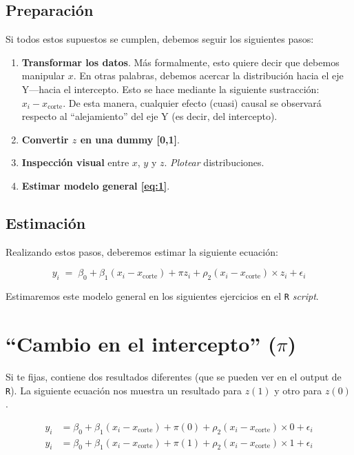 \documentclass[10pt]{article}
\begin{document}
\subsection*{Preparaci\'on}


Si todos estos supuestos se cumplen, debemos seguir los siguientes pasos:

\begin{enumerate}
	\item {\bf Transformar los datos}. M\'as formalmente, esto quiere decir que debemos manipular $x$. En otras palabras, debemos acercar la distribuci\'on hacia el eje Y---hacia el intercepto. Esto se hace mediante la siguiente sustracci\'on: $x_{i}-x_{\text{corte}}$. De esta manera, cualquier efecto (cuasi) causal se observar\'a respecto al ``alejamiento'' del eje Y (es decir, del intercepto).
	\item {\bf Convertir $z$ en una dummy [0,1]}. 
	\item {\bf Inspecci\'on visual} entre $x$, $y$ y $z$. \emph{Plotear} distribuciones.
	\item {\bf Estimar modelo general \autoref{eq:1}}.
\end{enumerate}

\subsection*{Estimaci\'on}


Realizando estos pasos, deberemos estimar la siguiente ecuaci\'on:

		\begin{equation}\label{eq:3}
			y_{i} \;=\; \beta_{0} + \beta_{1}(x_{i}-x_{\text{corte}}) + \pi z_{i} + \rho_{2}(x_{i}-x_{\text{corte}}) \times z_{i} +  \epsilon_{i}
		\end{equation}

Estimaremos este modelo general en los siguientes ejercicios en el \texttt{R} \emph{script}.

\section*{``Cambio en el intercepto'' ($\pi$)}

Si te fijas, \label{eq:3} contiene dos resultados diferentes (que se pueden ver en el output de \texttt{R}). La siguiente ecuaci\'on nos muestra un resultado para $z(1)$ y otro para $z(0)$.

\begin{equation} \label{eq:4}
\begin{split}
y_{i} & = \beta_{0} + \beta_{1}(x_{i}-x_{\text{corte}}) + \pi(0) + \rho_{2}(x_{i}-x_{\text{corte}}) \times 0 +  \epsilon_{i} \\
y_{i} & = \beta_{0} + \beta_{1}(x_{i}-x_{\text{corte}}) + \pi(1) + \rho_{2}(x_{i}-x_{\text{corte}}) \times 1 +  \epsilon_{i}
\end{split}
\end{equation}
\end{document}
